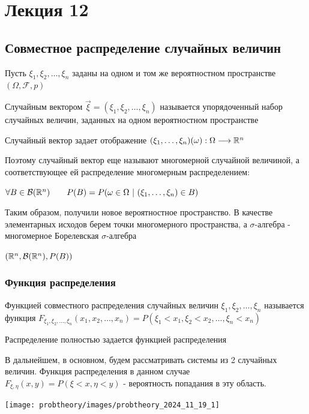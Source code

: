 \documentclass[12pt]{article}
\begin{document}
    \section{Лекция 12}

    \subsection{Совместное распределение случайных величин}

    Пусть $\xi_1, \xi_2, \dots, \xi_n$ заданы на одном и том же вероятностном пространстве $(\Omega, \mathcal{F}, p)$

    \Def Случайным вектором $\vec{\xi} = (\xi_1, \xi_2, \dots, \xi_n)$ называется упорядоченный набор случайных величин, заданных
    на одном вероятностном пространстве

    Случайный вектор задает отображение $(\xi_1, \dots, \xi_n) (\omega) : \Omega \longrightarrow \mathbb{R}^n$

    Поэтому случайный вектор еще называют многомерной случайной величиной, 
    а соответствующее ей распределение многомерным распределением: 

    $\forall B \in \mathcal{B}(\mathbb{R}^n) \qquad P(B) = P(\omega \in \Omega \ | \ (\xi_1, \dots, \xi_n) \in B)$

    Таким образом, получили новое вероятностное пространство. В качестве элементарных исходов берем точки многомерного пространства, 
    а $\sigma$-алгебра - многомерное Борелевская $\sigma$-алгебра

    $(\mathbb{R}^n, \mathcal{B}(\mathbb{R}^n), P(B))$

    \subsubsection{Функция распределения}

    \Def Функцией совместного распределения случайных величин $\xi_1, \xi_2, \dots, \xi_n$ называется функция 
    $F_{\xi_1, \xi_2, \dots, \xi_n}(x_1, x_2, \dots, x_n) = P(\xi_1 < x_1, \xi_2 < x_2, \dots, \xi_n < x_n)$

    \Notas Распределение полностью задается функцией распределения

    \Nota В дальнейшем, в основном, будем рассматривать системы из 2 случайных величин. Функция распределения в данном случае $F_{\xi, \eta}(x, y) = P(\xi < x, \eta < y)$ - вероятность попадания в эту область.

    \begin{center}
        \texttt{[image: probtheory/images/probtheory\_2024\_11\_19\_1]}
    \end{center}
\end{document}
